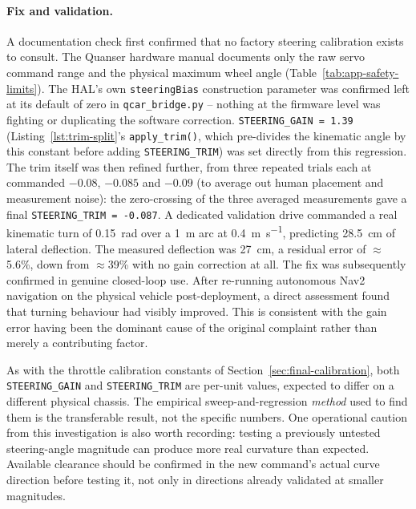 \paragraph{Fix and validation.} A documentation check first confirmed
that no factory steering calibration exists to consult. The Quanser
hardware manual \cite{quanser2023qcar} documents only the raw servo
command range and the physical maximum wheel angle
(Table~\ref{tab:app-safety-limits}). The HAL's own
\texttt{steeringBias} construction parameter was confirmed left at
its default of zero in \texttt{qcar\_bridge.py} -- nothing at the
firmware level was fighting or duplicating the software correction.
\texttt{STEERING\_GAIN = 1.39} (Listing~\ref{lst:trim-split}'s
\texttt{apply\_trim()}, which pre-divides the kinematic angle by this
constant before adding \texttt{STEERING\_TRIM}) was set directly from
this regression. The trim itself was then refined further, from three
repeated trials each at commanded $-0.08$, $-0.085$ and $-0.09$ (to
average out human placement and measurement noise): the zero-crossing
of the three averaged measurements gave a final
\texttt{STEERING\_TRIM = -0.087}. A dedicated validation drive commanded a real kinematic turn of
\SI{0.15}{\radian} over a \SI{1}{\meter} arc at
\SI{0.4}{\meter\per\second}, predicting \SI{28.5}{\centi\meter} of
lateral deflection. The measured deflection was \SI{27}{\centi\meter},
a residual error of $\approx$5.6\%, down from $\approx$39\% with no
gain correction at all. The fix was subsequently
confirmed in genuine closed-loop use. After re-running autonomous
Nav2 navigation on the physical vehicle post-deployment, a
direct assessment found that turning behaviour had visibly
improved. This is consistent with the gain error having been the
dominant cause of the original complaint rather than merely a
contributing factor.

As with the throttle calibration constants of
Section~\ref{sec:final-calibration}, both \texttt{STEERING\_GAIN} and
\texttt{STEERING\_TRIM} are per-unit values, expected to differ on a
different physical chassis. The empirical sweep-and-regression
\emph{method} used to find them is the transferable result, not the
specific numbers. One operational caution from this investigation is
also worth recording: testing a previously untested steering-angle
magnitude can produce more real curvature than expected. Available
clearance should be confirmed in the new command's actual curve
direction before testing it, not only in directions already validated
at smaller magnitudes.

